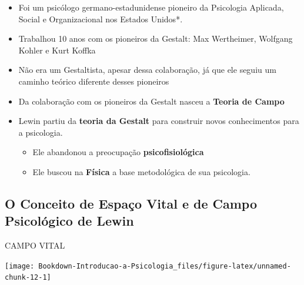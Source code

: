 \documentclass[
]{book}
\providecommand{\tightlist}{%
  \setlength{\itemsep}{0pt}\setlength{\parskip}{0pt}}
\begin{document}
\begin{itemize}
\tightlist
\item
  Foi um psicólogo germano-estadunidense pioneiro da Psicologia
  Aplicada, Social e Organizacional nos Estados
  Unidos*.
\item
  Trabalhou 10 anos com os pioneiros da Gestalt: Max Wertheimer,
  Wolfgang Kohler e Kurt Koffka
\item
  Não era um Gestaltista, apesar dessa colaboração, já que ele seguiu
  um caminho teórico diferente desses pioneiros
\item
  Da colaboração com os pioneiros da Gestalt nasceu a \textbf{Teoria de
  Campo}
\item
  Lewin partiu da \textbf{teoria da Gestalt} para construir novos
  conhecimentos para a psicologia.

  \begin{itemize}
  \tightlist
  \item
    Ele abandonou a preocupação \textbf{psicofisiológica}
  \item
    Ele buscou na \textbf{Física} a base metodológica de sua psicologia.
  \end{itemize}
\end{itemize}

\hypertarget{o-conceito-de-espauxe7o-vital-e-de-campo-psicoluxf3gico-de-lewin}{%
\subsection{\texorpdfstring{O Conceito de \textbf{Espaço Vital} e de \textbf{Campo Psicológico} de Lewin}{O Conceito de Espaço Vital e de Campo Psicológico de Lewin}}\label{o-conceito-de-espauxe7o-vital-e-de-campo-psicoluxf3gico-de-lewin}}

CAMPO VITAL

\texttt{[image: Bookdown-Introducao-a-Psicologia\_files/figure-latex/unnamed-chunk-12-1]}
\end{document}
